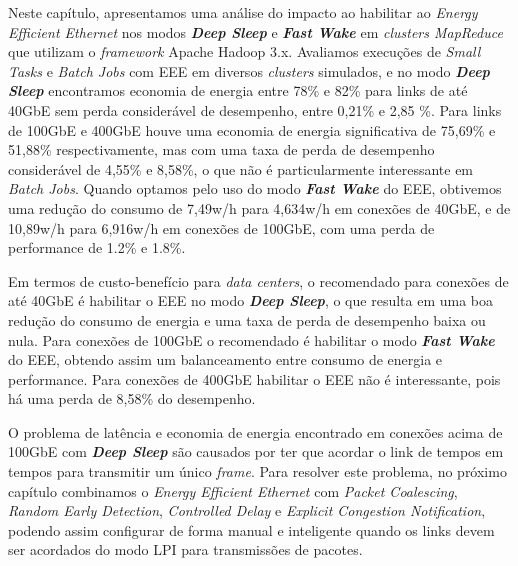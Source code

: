 Neste capítulo, apresentamos uma análise do impacto ao habilitar ao \emph{Energy Efficient Ethernet} nos modos \textbf{\emph{Deep Sleep}} e \textbf{\emph{Fast Wake}} em \emph{clusters MapReduce} que utilizam o \emph{framework} Apache Hadoop 3.x. Avaliamos execuções de \emph{Small Tasks} e \emph{Batch Jobs} com EEE em diversos \emph{clusters} simulados, e no modo \textbf{\emph{Deep Sleep}} encontramos economia de energia entre 78\% e 82\% para links de até 40GbE sem perda considerável de desempenho, entre 0,21\% e 2,85 \%. Para links de 100GbE e 400GbE houve uma economia de energia significativa de 75,69\% e 51,88\% respectivamente, mas com uma taxa de perda de desempenho considerável de 4,55\% e 8,58\%, o que não é particularmente interessante em \emph{Batch Jobs}. Quando optamos pelo uso do modo \textbf{\emph{Fast Wake}} do EEE, obtivemos uma redução do consumo de 7,49w/h para 4,634w/h em conexões de 40GbE, e de 10,89w/h para 6,916w/h em conexões de 100GbE, com uma perda de performance de 1.2\% e 1.8\%.

Em termos de custo-benefício para \emph{data centers}, o recomendado para conexões de até 40GbE é habilitar o EEE no modo \textbf{\emph{Deep Sleep}}, o que resulta em uma boa redução do consumo de energia e uma taxa de perda de desempenho baixa ou nula. Para conexões de 100GbE o recomendado é habilitar o modo \textbf{\emph{Fast Wake}} do EEE, obtendo assim um balanceamento entre consumo de energia e performance. Para conexões de 400GbE habilitar o EEE não é interessante, pois há uma perda de 8,58\% do desempenho.

O problema de latência e economia de energia encontrado em conexões acima de 100GbE com \textbf{\emph{Deep Sleep}} são causados por ter que acordar o link de tempos em tempos para transmitir um único \emph{frame}. Para resolver este problema, no próximo capítulo combinamos o \emph{Energy Efficient Ethernet} com \emph{Packet Coalescing}, \emph{Random Early Detection}, \emph{Controlled Delay}  e \emph{Explicit Congestion Notification}, podendo assim configurar de forma manual e inteligente quando os links devem ser acordados do modo LPI para transmissões de pacotes.

